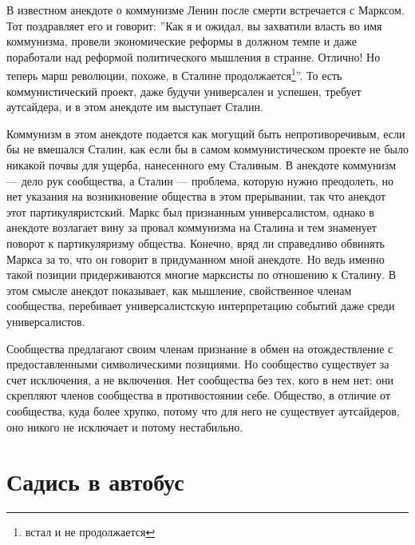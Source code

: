 \documentclass[12pt]{book}
\begin{document}
В известном анекдоте о коммунизме Ленин после смерти встречается с Марксом. Тот поздравляет его и говорит: ''Как я и ожидал, вы захватили власть во имя коммунизма, провели экономические реформы в должном темпе и даже поработали над реформой политического мышления в странне. Отлично! Но теперь марш революции, похоже, в Сталине продолжается\footnote{встал и не продолжается}''. То есть коммунистический проект, даже будучи универсален и успешен, требует аутсайдера, и в этом анекдоте им выступает Сталин.

Коммунизм в этом анекдоте подается как могущий быть непротиворечивым, если бы не вмешался Сталин, как если бы в самом коммунистическом проекте не было никакой почвы для ущерба, нанесенного ему Сталиным. В анекдоте коммунизм --- дело рук сообщества, а Сталин --- проблема, которую нужно преодолеть, но нет указания на возникновение общества в этом прерывании, так что анекдот этот партикуляристский. Маркс был признанным универсалистом, однако в анекдоте возлагает вину за провал коммунизма на Сталина и тем знаменует поворот к партикуляризму общества. Конечно, вряд ли справедливо обвинять Маркса за то, что он говорит в придуманном мной анекдоте. Но ведь именно такой позиции придерживаются многие марксисты по отношению к Сталину. В этом смысле анекдот показывает, как мышление, свойственное членам сообщества, перебивает универсалистскую интерпретацию событий даже среди универсалистов.

Сообщества предлагают своим членам признание в обмен на отождествление с предоставленными символическими позициями. Но сообщество существует за счет исключения, а не включения. Нет сообщества без тех, кого в нем нет: они скрепляют членов сообщества в противостоянии себе. Общество, в отличие от сообщества, куда более хрупко, потому что для него не существует аутсайдеров, оно никого не исключает и потому нестабильно.

\section{Садись в автобус}
\end{document}
